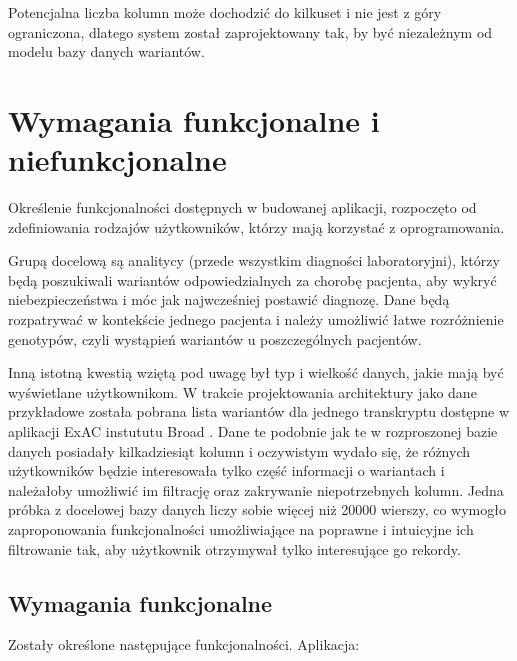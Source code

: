 \documentclass[a4paper,12pt,twoside]{article}
\begin{document}
Potencjalna liczba kolumn może dochodzić do kilkuset
i nie jest z góry ograniczona, dlatego system został zaprojektowany tak, by być niezależnym od modelu bazy danych wariantów.
\newpage
\section{Wymagania funkcjonalne i niefunkcjonalne}

Określenie funkcjonalności dostępnych w budowanej aplikacji, rozpoczęto od zdefiniowania rodzajów użytkowników, którzy mają korzystać z oprogramowania.

Grupą docelową są analitycy (przede wszystkim diagności laboratoryjni), którzy będą poszukiwali wariantów odpowiedzialnych za chorobę pacjenta, aby wykryć niebezpieczeństwa i móc jak najwcześniej postawić diagnozę.
Dane będą rozpatrywać w kontekście jednego pacjenta i należy umożliwić łatwe rozróżnienie genotypów, czyli wystąpień wariantów u poszczególnych pacjentów.

Inną istotną kwestią wziętą pod uwagę był typ i wielkość danych, jakie mają być wyświetlane użytkownikom.
W trakcie projektowania architektury jako dane przykładowe została pobrana lista wariantów dla jednego transkryptu dostępne w aplikacji ExAC instututu Broad \cite{exac} \cite{exacCite}. Dane te
podobnie jak te w rozproszonej bazie danych posiadały kilkadziesiąt kolumn i oczywistym wydało się, że różnych użytkowników będzie interesowała tylko część informacji o wariantach i należałoby umożliwić im filtrację oraz zakrywanie niepotrzebnych kolumn.
Jedna próbka z docelowej bazy danych liczy sobie więcej niż 20000 wierszy, co wymogło zaproponowania
funkcjonalności umożliwiające na poprawne i intuicyjne ich filtrowanie
tak, aby użytkownik otrzymywał tylko interesujące go rekordy.

\subsection{Wymagania funkcjonalne}
Zostały określone następujące funkcjonalności. Aplikacja:
\end{document}
